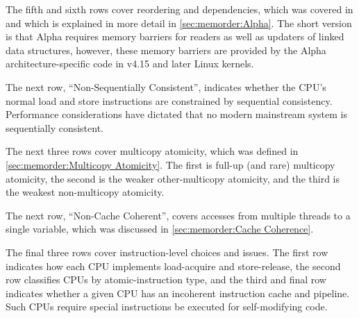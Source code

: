 The fifth and sixth rows cover reordering and dependencies,
which was covered in
and which is explained in more detail in
\cref{sec:memorder:Alpha}.
The short version is that Alpha requires memory barriers for readers
as well as updaters of linked data structures, however, these memory
barriers are provided by the Alpha architecture-specific code in
v4.15 and later Linux kernels.

The next row, ``Non-Sequentially Consistent'', indicates whether
the CPU's normal load and store instructions are constrained by
sequential consistency.
Performance considerations have dictated that no modern mainstream
system is sequentially consistent.

The next three rows cover multicopy atomicity, which was defined in
\cref{sec:memorder:Multicopy Atomicity}.
The first is full-up (and rare) multicopy atomicity, the second is the
weaker other-multicopy atomicity, and the third is the weakest
non-multicopy atomicity.

The next row, ``Non-Cache Coherent'', covers accesses from multiple
threads to a single variable, which was discussed in
\cref{sec:memorder:Cache Coherence}.

The final three rows cover instruction-level choices and issues.
The first row indicates how each CPU implements load-acquire
and store-release, the second row classifies CPUs by atomic-instruction
type, and the third and final row
indicates whether a given CPU has an incoherent
instruction cache and pipeline.
Such CPUs require special instructions be executed for self-modifying
code.


